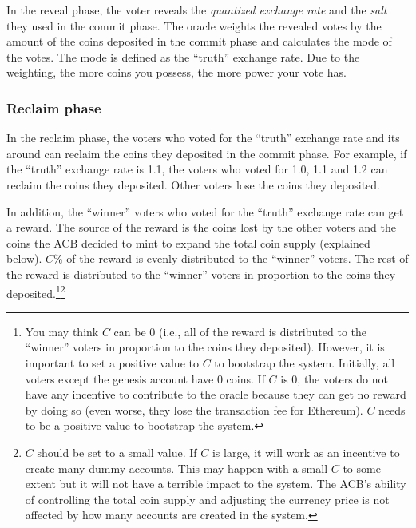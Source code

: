 \documentclass[dvipdfmx,a4paper]{article}
\begin{document}
In the reveal phase, the voter reveals the \textit{quantized exchange rate} and the \textit{salt} they used in the commit phase. The oracle weights the revealed votes by the amount of the coins deposited in the commit phase and calculates the mode of the votes. The mode is defined as the ``truth'' exchange rate. Due to the weighting, the more coins you possess, the more power your vote has.

\subsubsection{Reclaim phase}

In the reclaim phase, the voters who voted for the ``truth'' exchange rate and its around can reclaim the coins they deposited in the commit phase. For example, if the ``truth'' exchange rate is 1.1, the voters who voted for 1.0, 1.1 and 1.2 can reclaim the coins they deposited. Other voters lose the coins they deposited.

In addition, the ``winner'' voters who voted for the ``truth'' exchange rate can get a reward. The source of the reward is the coins lost by the other voters and the coins the ACB decided to mint to expand the total coin supply (explained below). $C$\% of the reward is evenly distributed to the ``winner'' voters. The rest of the reward is distributed to the ``winner'' voters in proportion to the coins they deposited.\footnote{You may think $C$ can be 0 (i.e., all of the reward is distributed to the ``winner'' voters in proportion to the coins they deposited). However, it is important to set a positive value to $C$ to bootstrap the system. Initially, all voters except the genesis account have 0 coins. If $C$ is 0, the voters do not have any incentive to contribute to the oracle because they can get no reward by doing so (even worse, they lose the transaction fee for Ethereum). $C$ needs to be a positive value to bootstrap the system.}\footnote{$C$ should be set to a small value. If $C$ is large, it will work as an incentive to create many dummy accounts. This may happen with a small $C$ to some extent but it will not have a terrible impact to the system. The ACB's ability of controlling the total coin supply and adjusting the currency price is not affected by how many accounts are created in the system.}
\end{document}
